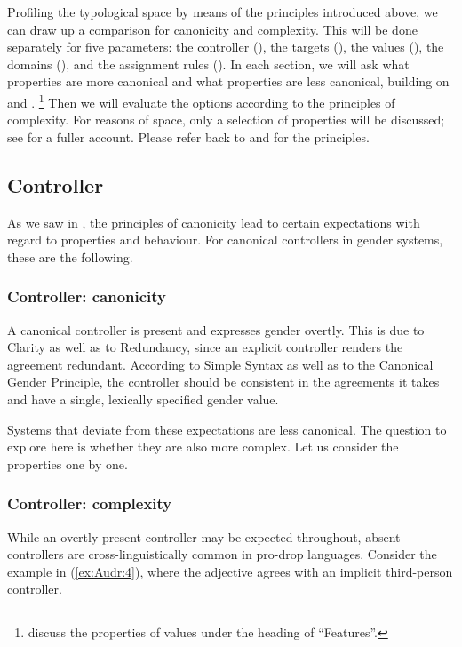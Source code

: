 \documentclass[output=collectionpaper]{langsci/langscibook}
\begin{document}
Profiling the typological space by means of the principles introduced above, we can draw up a comparison for canonicity and complexity. This will be done separately for five parameters: the controller (), the targets (), the values (), the domains (), and the assignment rules (). In each section, we will ask what properties are more canonical and what properties are less canonical, building on \citet{Corbett2006,Corbett2012} and \citet{Corbett2016}.%
\footnote{\cite[514--517]{Corbett2016} discuss the properties of values under the heading of ``Features''.} %
Then we will evaluate the options according to the principles of complexity. For reasons of space, only a selection of properties will be discussed; see \citet{Audring2017} for a fuller account. Please refer back to  and  for the principles.

\subsection{Controller}
\label{sec:Audr:3.2}

As we saw in , the principles of canonicity lead to certain expectations with regard to properties and behaviour. For canonical controllers in gender systems, these are the following.

\subsubsection{Controller: canonicity}

A canonical controller is present and expresses gender overtly. This is due to Clarity as well as to Redundancy, since an explicit controller renders the agreement redundant. According to Simple Syntax as well as to the Canonical Gender Principle, the controller should be consistent in the agreements it takes and have a single, lexically specified gender value.

Systems that deviate from these expectations are less canonical. The question to explore here is whether they are also more complex. Let us consider the properties one by one.

\subsubsection{Controller: complexity}

While an overtly present controller may be expected throughout, absent controllers are cross-linguistically common in pro-drop languages. Consider the  example in (\ref{ex:Audr:4}), where the adjective agrees with an implicit third-person controller.
\end{document}
